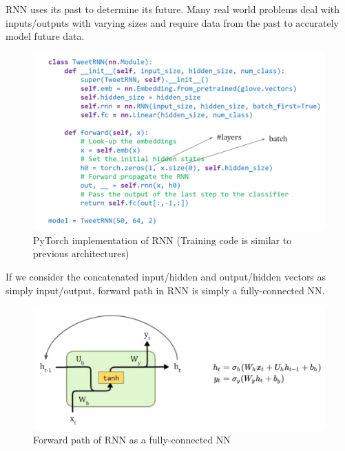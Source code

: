 \begin{idea}
    RNN uses its past to determine its future. Many real world problems deal with inputs/outputs with varying sizes and require data from the past to accurately model future data.
\end{idea}

\begin{figure}
    \centering
    \includegraphics[width=1\linewidth]{rnnarc.png}
    \caption{PyTorch implementation of RNN (Training code is similar to previous architectures)}
    \label{fig:enter-label}
\end{figure}

If we consider the concatenated input/hidden and output/hidden vectors as simply input/output, forward path in RNN is simply a fully-connected NN.

\begin{figure}[h!t]
    \centering
    \includegraphics[width=1\linewidth]{rnnforwardpath.png}
    \caption{Forward path of RNN as a fully-connected NN}
    \label{fig:enter-label}
\end{figure}

